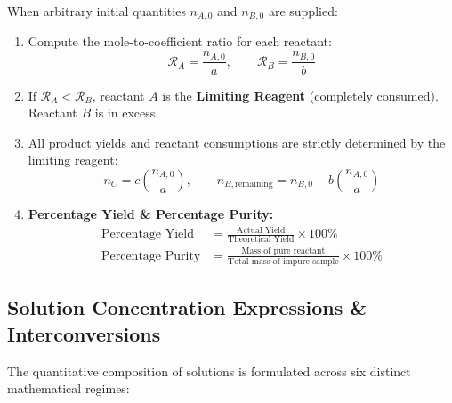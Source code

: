 \documentclass[10pt,twoside,openright]{book}
\begin{document}
\begin{usecasebox}
When arbitrary initial quantities $n_{A,0}$ and $n_{B,0}$ are supplied:
\begin{enumerate}
  \item Compute the mole-to-coefficient ratio for each reactant:
  \begin{equation}
    \mathcal{R}_A = \frac{n_{A,0}}{a}, \qquad \mathcal{R}_B = \frac{n_{B,0}}{b}
  \end{equation}
  \item If $\mathcal{R}_A < \mathcal{R}_B$, reactant $A$ is the \textbf{Limiting Reagent} (completely consumed). Reactant $B$ is in excess.
  \item All product yields and reactant consumptions are strictly determined by the limiting reagent:
  \begin{equation}
    n_C = c \left(\frac{n_{A,0}}{a}\right), \qquad n_{B,\text{remaining}} = n_{B,0} - b \left(\frac{n_{A,0}}{a}\right)
  \end{equation}
  \item \textbf{Percentage Yield \& Percentage Purity:}
  \begin{align}
    \text{Percentage Yield} &= \frac{\text{Actual Yield}}{\text{Theoretical Yield}} \times 100\% \\
    \text{Percentage Purity} &= \frac{\text{Mass of pure reactant}}{\text{Total mass of impure sample}} \times 100\%
  \end{align}
\end{enumerate}
\end{usecasebox}

\subsection{Solution Concentration Expressions \& Interconversions}
The quantitative composition of solutions is formulated across six distinct mathematical regimes:
\end{document}
